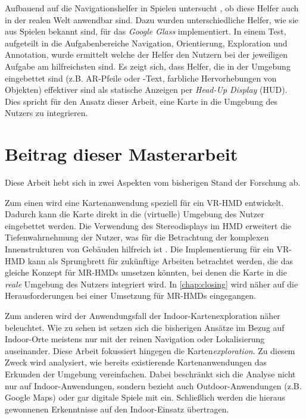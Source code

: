 Aufbauend auf die Navigationshelfer in Spielen untersucht \textcite{Lodts2015}, ob diese Helfer auch in der realen Welt anwendbar sind.
Dazu wurden unterschiedliche Helfer, wie sie aus Spielen bekannt sind, für das \emph{Google Glass} implementiert.
In einem Test, aufgeteilt in die Aufgabenbereiche Navigation, Orientierung, Exploration und Annotation, wurde ermittelt welche der Helfer den Nutzern bei der jeweiligen Aufgabe am hilfreichsten sind.
Es zeigt sich, dass Helfer, die in der Umgebung eingebettet sind (z.B. AR-Pfeile oder -Text, farbliche Hervorhebungen von Objekten) effektiver sind als statische Anzeigen per \emph{Head-Up Display} (HUD).
Dies spricht für den Ansatz dieser Arbeit, eine Karte in die Umgebung des Nutzers zu integrieren.

\section{Beitrag dieser Masterarbeit}
Diese Arbeit hebt sich in zwei Aspekten vom bisherigen Stand der Forschung ab.

Zum einen wird eine Kartenanwendung speziell für ein VR-HMD entwickelt.
Dadurch kann die Karte direkt in die (virtuelle) Umgebung des Nutzer eingebettet werden.
Die Verwendung des Stereodisplays im HMD erweitert die Tiefenwahrnehmung der Nutzer, was für die Betrachtung der komplexen Innenstrukturen von Gebäuden hilfreich ist \parencite[vgl.][]{Rantakari2017}.
Die Implementierung für ein VR-HMD kann als Sprungbrett für zukünftige Arbeiten betrachtet werden, die das gleiche Konzept für MR-HMDs umsetzen könnten, bei denen die Karte in die \emph{reale} Umgebung des Nutzers integriert wird.
In \autoref{chap:closing} wird näher auf die Herausforderungen bei einer Umsetzung für MR-HMDs eingegangen.

Zum anderen wird der Anwendungsfall der Indoor-Kartenexploration näher beleuchtet.
Wie zu sehen ist setzen sich die bisherigen Ansätze im Bezug auf Indoor-Orte meistens nur mit der reinen Navigation oder Lokalisierung auseinander.
Diese Arbeit fokussiert hingegen die Karten\emph{exploration}.
Zu diesem Zweck wird analysiert, wie bereits existierende Kartenanwendungen das Erkunden der Umgebung vereinfachen.
Dabei beschränkt sich die Analyse nicht nur auf Indoor-Anwendungen, sondern bezieht auch Outdoor-Anwendungen (z.B. Google Maps) oder gar digitale Spiele mit ein.
Schließlich werden die hieraus gewonnenen Erkenntnisse auf den Indoor-Einsatz übertragen.
%
\cleardoublepage
